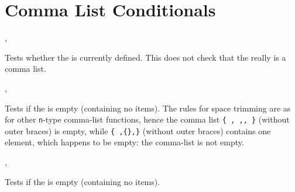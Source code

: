 \documentclass[oneside]{book}
\begin{document}
\section{Comma List Conditionals}

\begin{function}{\ClistIfExist,\ClistIfExistTF}
\begin{syntax}
 
   
\end{syntax}
Tests whether the  is currently defined.  This does
not check that the  really is a comma list.
\begin{demohigh}
\ClistIfExistTF {} {}
\ClistIfExistTF {} {}
\end{demohigh}
\end{function}

\begin{function}{\ClistIfEmpty,\ClistIfEmptyTF}
\begin{syntax}
 
   
\end{syntax}
Tests if the  is empty (containing no items).
The rules for space trimming are as for other \texttt{n}-type
comma-list functions, hence the comma list \verb|{ , ,, }| (without
outer braces) is empty, while \verb|{ ,{},}| (without outer braces)
contains one element, which happens to be empty: the comma-list
is not empty.
\begin{demohigh}
 {} {}
\ClistIfEmptyTF { , } {} {}
\end{demohigh}
\end{function}

\begin{function}{\ClistVarIfEmpty,\ClistVarIfEmptyTF}
\begin{syntax}
 
   
\end{syntax}
Tests if the  is empty (containing no items).
\begin{demohigh}
\ClistSet {}
\ClistVarIfEmptyTF {} {}
\ClistClear \lTmpaClist
\ClistVarIfEmptyTF {} {}
\end{demohigh}
\end{function}
 
\end{document}
